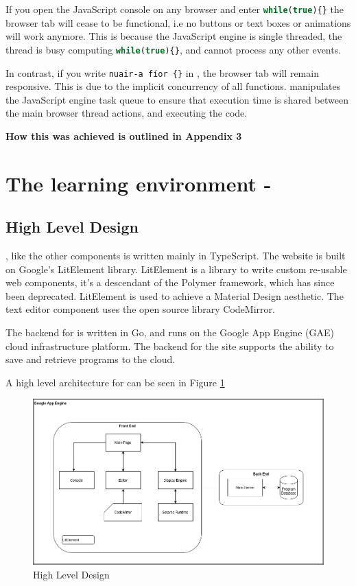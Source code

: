 If you open the JavaScript console on any browser and enter \lstinline[language=javascript]|while(true){}| the browser tab will cease to be functional, i.e no buttons or text boxes or animations will work anymore. This is because the JavaScript engine is single threaded, the thread is busy computing \lstinline[language=javascript]|while(true){}|, and cannot process any other events.

In contrast, if you write \lstinline[language=setanta]|nuair-a fíor {}| in \Setanta{}, the browser tab will remain responsive. This is due to the implicit concurrency of all \Setanta{} functions. \Setanta{} manipulates the JavaScript engine task queue to ensure that execution time is shared between the main browser thread actions, and executing the \Setanta{} code.

\textbf{How this was achieved is outlined in Appendix 3}

\section{The learning environment - \trys{}}

\subsection{High Level Design}

\trys{}, like the other components is written mainly in TypeScript. The website is built on Google's LitElement library. LitElement is a library to write custom re-usable web components, it's a descendant of the Polymer framework, which has since been deprecated. LitElement is used to achieve a Material Design aesthetic. The text editor component uses the open source library CodeMirror.

The backend for \trys{} is written in Go, and runs on the Google App Engine (GAE) cloud infrastructure platform. The backend for the site supports the ability to save and retrieve \Setanta{} programs to the cloud.

A high level architecture for \trys{} can be seen in Figure \ref{trysetantadiagram}

\begin{figure}
    \caption{\trys{} High Level Design}
    \label{trysetantadiagram}
    \begin{center}
    \includegraphics[scale=0.4]{trysetantadiagram}
    \end{center}
\end{figure}

